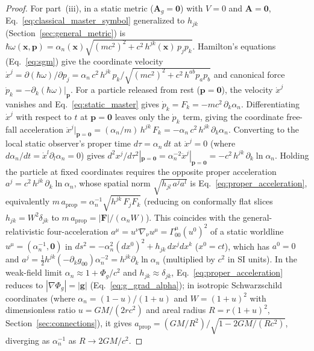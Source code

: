 \documentclass[aps,prd,onecolumn,tightenlines,nofootinbib,notitlepage,11pt,floatfix]{revtex4-2}
\theoremstyle{indentedtheorem}
\begin{document}
\begin{proof}
For part~(iii), in a static metric ($\mathbf{A}_g=\mathbf{0}$) with $V=0$ and $\mathbf{A}=\mathbf{0}$, Eq.~\eqref{eq:classical_master_symbol} generalized to $h_{jk}$ (Section~\ref{sec:general_metric}) is $\hbar\omega(\mathbf{x},\mathbf{p}) = \alpha_n(\mathbf{x})\sqrt{(mc^2)^2 + c^2\,h^{jk}(\mathbf{x})\,p_j p_k}$. Hamilton's equations (Eq.~\eqref{eq:sgm}) give the coordinate velocity $\dot{x}^j = \partial(\hbar\omega)/\partial p_j = \alpha_n\,c^2\,h^{jk}\,p_k/\sqrt{(mc^2)^2 + c^2\,h^{ab}p_a p_b}$ and canonical force $\dot{p}_k = -\partial_k(\hbar\omega)|_{\mathbf{p}}$. For a particle released from rest ($\mathbf{p}=\mathbf{0}$), the velocity $\dot{x}^j$ vanishes and Eq.~\eqref{eq:static_master} gives $\dot{p}_k = F_k = -mc^2\,\partial_k\alpha_n$. Differentiating $\dot{x}^j$ with respect to $t$ at $\mathbf{p}=\mathbf{0}$ leaves only the $\dot{p}_k$ term, giving the coordinate free-fall acceleration $\ddot{x}^j|_{\mathbf{p}=\mathbf{0}} = (\alpha_n/m)\,h^{jk}\,F_k = -\alpha_n\,c^2\,h^{jk}\,\partial_k\alpha_n$. Converting to the local static observer's proper time $d\tau=\alpha_n\,dt$ at $\dot{x}^j=0$ (where $d\alpha_n/dt=\dot{x}^l\partial_l\alpha_n=0$) gives $d^2 x^j/d\tau^2|_{\mathbf{p}=\mathbf{0}} = \alpha_n^{-2}\ddot{x}^j|_{\mathbf{p}=\mathbf{0}} = -c^2\,h^{jk}\,\partial_k\ln\alpha_n$. Holding the particle at fixed coordinates requires the opposite proper acceleration $a^j = c^2\,h^{jk}\,\partial_k\ln\alpha_n$, whose spatial norm $\sqrt{h_{jl}\,a^j a^l}$ is Eq.~\eqref{eq:proper_acceleration}, equivalently $m\,a_\text{prop} = \alpha_n^{-1}\sqrt{h^{jk}\,F_j F_k}$ (reducing on conformally flat slices $h_{jk}=W^2\delta_{jk}$ to $m\,a_\text{prop} = |\mathbf{F}|/(\alpha_n W)$). This coincides with the general-relativistic four-acceleration $a^\mu = u^\nu\nabla_\nu u^\mu = \Gamma^\mu_{00}(u^0)^2$ of a static worldline $u^\mu = (\alpha_n^{-1},\mathbf{0})$ in $ds^2 = -\alpha_n^2(dx^0)^2 + h_{jk}\,dx^j dx^k$ ($x^0=ct$), which has $a^0=0$ and $a^j = \tfrac{1}{2}h^{jk}(-\partial_k g_{00})\alpha_n^{-2} = h^{jk}\partial_k\ln\alpha_n$ (multiplied by $c^2$ in SI units). In the weak-field limit $\alpha_n\approx 1+\Phi_g/c^2$ and $h_{jk}\approx\delta_{jk}$, Eq.~\eqref{eq:proper_acceleration} reduces to $|\nabla\Phi_g|=|\mathbf{g}|$ (Eq.~\eqref{eq:g_grad_alpha}); in isotropic Schwarzschild coordinates (where $\alpha_n=(1-u)/(1+u)$ and $W=(1+u)^2$ with dimensionless ratio $u=GM/(2rc^2)$ and areal radius $R=r(1+u)^2$, Section~\ref{sec:connections}), it gives $a_\text{prop} = (GM/R^2)/\sqrt{1-2GM/(Rc^2)}$, diverging as $\alpha_n^{-1}$ as $R\to 2GM/c^2$.


\end{proof}
\end{document}
